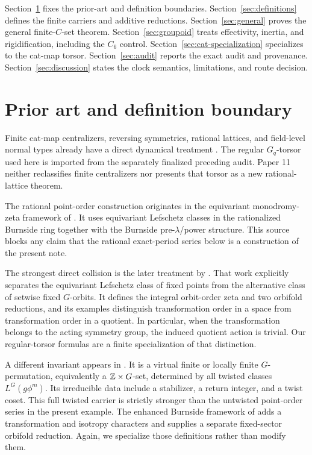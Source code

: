 \documentclass[11pt]{article}
\theoremstyle{definition}
\theoremstyle{remark}
\begin{document}
Section~\ref{sec:prior} fixes the prior-art and definition boundaries.
Section~\ref{sec:definitions} defines the finite carriers and additive
reductions.  Section~\ref{sec:general} proves the general finite-\(C\)-set
theorem.  Section~\ref{sec:groupoid} treats effectivity, inertia, and
rigidification, including the \(C_6\) control.
Section~\ref{sec:cat-specialization} specializes to the cat-map torsor.
Section~\ref{sec:audit} reports the exact audit and provenance.
Section~\ref{sec:discussion} states the clock semantics, limitations, and
route decision.

\section{Prior art and definition boundary}
\label{sec:prior}

Finite cat-map centralizers, reversing symmetries, rational lattices, and
field-level normal types already have a direct dynamical treatment
\citep{BaakeNeumaerkerRoberts2013}.  The regular \(G_q\)-torsor used here is
imported from the separately finalized preceding audit.  Paper 11 neither
reclassifies finite centralizers nor presents that torsor as a new
rational-lattice theorem.

The rational point-order construction originates in the equivariant
monodromy-zeta framework of
\citet{GuseinZadeLuengoMelle2008}.  It uses equivariant Lefschetz classes in
the rationalized Burnside ring together with the Burnside
pre-\(\lambda\)/power structure.  This source blocks any claim that the
rational exact-period series below is a construction of the present note.

The strongest direct collision is the later treatment by
\citet{GuseinZadeLuengoMelle2015}.  That work explicitly separates the
equivariant Lefschetz class of fixed points from the alternative class of
setwise fixed \(G\)-orbits.  It defines the integral orbit-order zeta and two
orbifold reductions, and its examples distinguish transformation order in a
space from transformation order in a quotient.  In particular, when the
transformation belongs to the acting symmetry group, the induced quotient
action is trivial.  Our regular-torsor formulas are a finite specialization
of that distinction.

A different invariant appears in \citet{GuseinZade2013}.  It is a virtual
finite or locally finite \(G\)-permutation, equivalently a
\(\mathbb{Z}\times G\)-set, determined by all twisted classes \(L^G(g\phi^m)\).
Its irreducible data include a stabilizer, a return integer, and a twist
coset.  This full twisted carrier is strictly stronger than the untwisted
point-order series in the present example.  The enhanced Burnside framework
of \citet{EbelingGuseinZade2018} adds a transformation and isotropy
characters and supplies a separate fixed-sector orbifold reduction.  Again,
we specialize those definitions rather than modify them.
\end{document}
